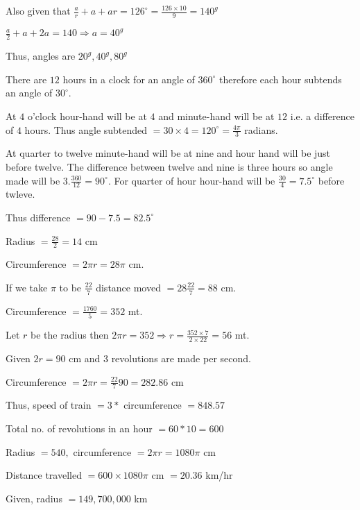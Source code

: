     Also given that $\frac{a}{r} + a + ar = 126^\circ = \frac{126\times 10}{9} = 140^g$

    $\frac{a}{2} + a + 2a = 140 \Rightarrow a = 40^g$

    Thus, angles are $20^g, 40^g, 80^g$

\item There are $12$ hours in a clock for an angle of $360^\circ$ therefore each hour subtends an angle of
    $30^\circ.$

    At $4$ o'clock hour-hand will be at $4$ and minute-hand will be at $12$ i.e. a difference of $4$
    hours. Thus angle subtended $= 30\times 4 = 120^\circ = \frac{4\pi}{3}$ radians.

\item At quarter to twelve minute-hand will be at nine and hour hand will be just before twelve. The difference between twelve and
    nine is three hours so angle made will be $3.\frac{360}{12} = 90^\circ.$ For quarter of hour hour-hand will be
    $\frac{30}{4} = 7.5^\circ$ before twleve.

    Thus difference $= 90 - 7.5 = 82.5^\circ$

\item Radius $= \frac{28}{2} = 14$ cm

    Circumference $= 2\pi r = 28\pi$ cm.

    If we take $\pi$ to be $\frac{22}{7}$ distance moved $= 28\frac{22}{7} = 88$ cm.

\item Circumference $= \frac{1760}{5} = 352$ mt.

    Let $r$ be the radius then $2\pi r = 352 \Rightarrow r = \frac{352\times 7}{2\times 22} = 56$ mt.

\item Given $2r = 90$ cm and $3$ revolutions are made per second.

    Circumference $= 2\pi r = \frac{22}{7}90 = 282.86$ cm

    Thus, speed of train $= 3*$ circumference $= 848.57$

\item Total no. of revolutions in an hour $= 60*10 = 600$

    Radius $= 540,$ circumference $= 2\pi r = 1080\pi$ cm

    Distance travelled $= 600\times 1080\pi$ cm $= 20.36$ km/hr

\item Given, radius $= 149,700,000$ km

